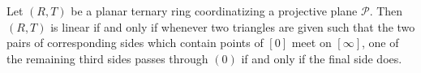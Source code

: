 Let $(R, T)$ be a planar ternary ring coordinatizing a projective plane $\mathcal{P}$.
Then $(R, T)$ is linear if and only if whenever two triangles are given such that
the two pairs of corresponding sides which contain points of $[0]$ meet on $[\infty]$,
one of the remaining third sides passes through $(0)$ if and only if the final side does.
